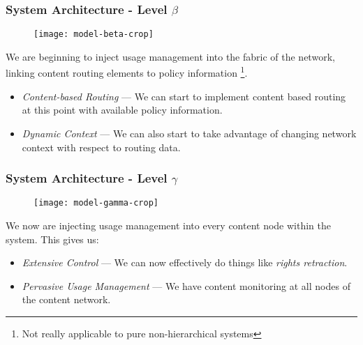 \begin{frame}[t]
\frametitle{System Architecture - Level $\beta$}
\begin{figure}[!t]
\centering
\texttt{[image: model-beta-crop]}
\label{fig:model:beta}
\end{figure}
We are beginning to inject usage management into the fabric of the network, linking content routing elements to policy information \footnote{Not really applicable to pure non-hierarchical systems}.
\newline
\pause
\begin{itemize}
\item \textit{Content-based Routing} --- We can start to implement content based routing at this point with available policy information.
\pause
\item \textit{Dynamic Context} --- We can also start to take advantage of changing network context with respect to routing data.
\end{itemize}
\end{frame}

\begin{frame}[t]
\frametitle{System Architecture - Level $\gamma$}
\begin{figure}[!t]
\centering
\texttt{[image: model-gamma-crop]}
\label{fig:model:gamma}
\end{figure}
We now are injecting usage management into every content node within the system.  This gives us:
\newline
\pause
\begin{itemize}
\item \textit{Extensive Control} --- We can now effectively do things like \textit{rights retraction}.
\pause
\item \textit{Pervasive Usage Management } --- We have content monitoring at all nodes of the content network.
\end{itemize}
\end{frame}

